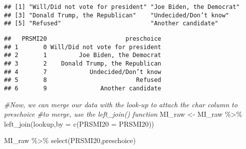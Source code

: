 \documentclass[
]{article}
\newenvironment{Shaded}{\begin{snugshade}}{\end{snugshade}}
\newcommand{\AttributeTok}[1]{\textcolor[rgb]{0.77,0.63,0.00}{#1}}
\newcommand{\CommentTok}[1]{\textcolor[rgb]{0.56,0.35,0.01}{\textit{#1}}}
\newcommand{\FunctionTok}[1]{\textcolor[rgb]{0.00,0.00,0.00}{#1}}
\newcommand{\NormalTok}[1]{#1}
\newcommand{\OtherTok}[1]{\textcolor[rgb]{0.56,0.35,0.01}{#1}}
\newcommand{\SpecialCharTok}[1]{\textcolor[rgb]{0.00,0.00,0.00}{#1}}
\newcommand{\StringTok}[1]{\textcolor[rgb]{0.31,0.60,0.02}{#1}}
\begin{document}
\begin{Shaded}
\end{Shaded}

\begin{verbatim}
## [1] "Will/Did not vote for president" "Joe Biden, the Democrat"        
## [3] "Donald Trump, the Republican"    "Undecided/Don’t know"           
## [5] "Refused"                         "Another candidate"
\end{verbatim}

\begin{Shaded}
\end{Shaded}

\begin{verbatim}
##   PRSMI20                      preschoice
## 1       0 Will/Did not vote for president
## 2       1         Joe Biden, the Democrat
## 3       2    Donald Trump, the Republican
## 4       7            Undecided/Don’t know
## 5       8                         Refused
## 6       9               Another candidate
\end{verbatim}

\begin{Shaded}
\begin{Highlighting}[]
\CommentTok{\#Now, we can merge our data with the look{-}up to attach the char column to preschoice}
\CommentTok{\#to merge, use the left\_join() function}
\NormalTok{MI\_raw }\OtherTok{\textless{}{-}}\NormalTok{ MI\_raw }\SpecialCharTok{\%\textgreater{}\%}
  \FunctionTok{left\_join}\NormalTok{(lookup,}\AttributeTok{by =} \FunctionTok{c}\NormalTok{(}\StringTok{\textquotesingle{}PRSMI20\textquotesingle{}} \OtherTok{=} \StringTok{\textquotesingle{}PRSMI20\textquotesingle{}}\NormalTok{))}

\NormalTok{MI\_raw }\SpecialCharTok{\%\textgreater{}\%}
  \FunctionTok{select}\NormalTok{(PRSMI20,preschoice)}
\end{Highlighting}
\end{Shaded}
\end{document}
